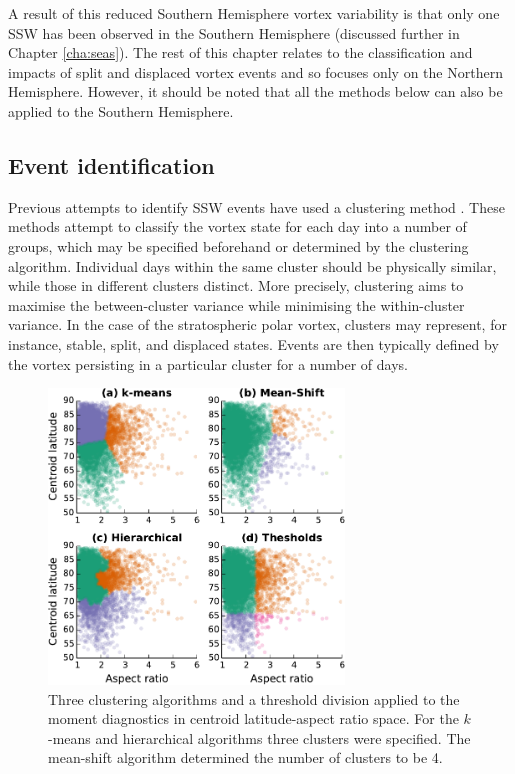 A result of this reduced Southern Hemisphere vortex variability is that only one
SSW has been observed in the Southern Hemisphere (discussed further in Chapter
\ref{cha:seas}). The rest of this chapter relates to the classification and
impacts of split and displaced vortex events and so focuses only on the
Northern Hemisphere. However, it should be noted that all the methods below can
also be applied to the Southern Hemisphere.


\subsection{Event identification}
\label{sec:event-definition}

Previous attempts to identify SSW events have used a clustering method
\citep{K.Coughlin2009,Hannachi2010}. These methods attempt to classify the
vortex state for each day into a number of groups, which may be specified
beforehand or determined by the clustering algorithm. Individual days within the
same cluster should be physically similar, while those in different clusters
distinct. More precisely, clustering aims to maximise the between-cluster
variance while minimising the within-cluster variance. In the case of the
stratospheric polar vortex, clusters may represent, for instance, stable, split,
and displaced states. Events are then typically defined by the vortex persisting
in a particular cluster for a number of days.

\begin{figure}
 \centering
 \noindent\includegraphics[width=0.7\textwidth]{figures/chapter-moments/clustering.pdf}
 \caption[Clustering algorithms applied to the moment diagnostics.]{Three
   clustering algorithms and a threshold division applied to the moment
   diagnostics in centroid latitude-aspect ratio space. For the $k$-means and
   hierarchical algorithms three clusters were specified. The mean-shift
   algorithm determined the number of clusters to be 4.}
 \label{fig:clusters}
\end{figure}


